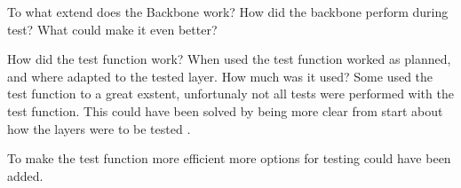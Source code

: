 To what extend does the Backbone work? 
How did the backbone perform during test?
What could make it even better?


How did the test function work?
When used the test function worked as planned, and where adapted to the tested layer. 
How much was it used?
Some used the test function to a great exstent, unfortunaly not all tests were performed with the test function. This could have been solved by being more clear from start about how the layers were to be tested . 

To make the test function more efficient more options for testing could have been added.

